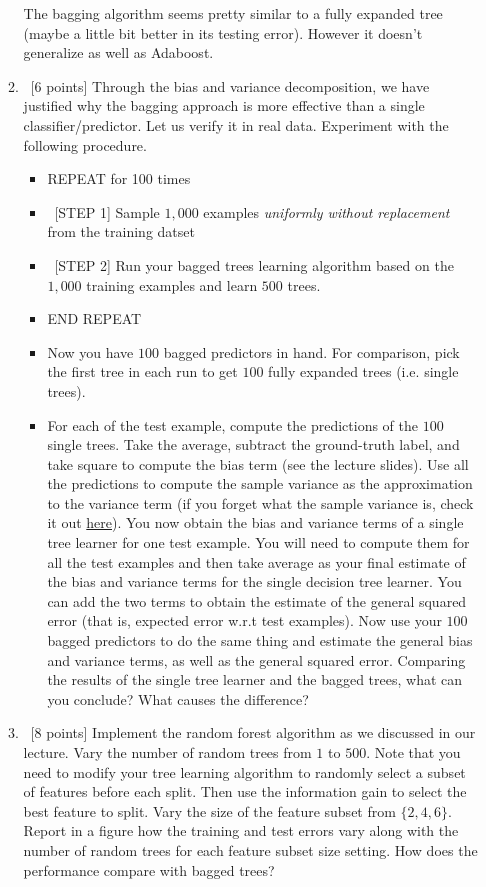 \documentclass[12pt, fullpage,letterpaper]{article}
\begin{document}
\begin{enumerate}
\begin{enumerate}
	\newline
	The bagging algorithm seems pretty similar to a fully expanded tree (maybe a little bit better in its testing error).  However it doesn't generalize as well as Adaboost.
	\item~[6 points] Through the bias and variance decomposition, we have justified why the bagging approach is more effective than a single classifier/predictor. Let us verify it in real data. Experiment with the following procedure.
	\begin{itemize}
		\item REPEAT for 100 times
		\item ~[STEP 1] Sample $1,000$ examples \textit{uniformly without replacement} from the training datset
		\item ~[STEP 2] Run your bagged trees learning algorithm based on the $1,000$ training examples and learn $500$ trees.
		\item END REPEAT 
		\item Now you have $100$ bagged predictors in hand. For comparison, pick the first tree in each run to get $100$ fully expanded trees (i.e. single trees). 
		\item 	For each of the test example, compute the predictions of the $100$ single trees. Take the average, subtract the ground-truth label, and take square to compute the bias term (see the lecture slides). Use all the predictions to compute the sample variance  as the approximation to the variance term (if you forget what the sample variance is, check it out 
		\href{http://www.randomservices.org/random/sample/Variance.html}{here}). You now obtain the bias and variance terms of a single tree learner for one test example. You will need to compute them for all the test examples and then take average as your final estimate of the bias and variance terms for the single decision tree learner. You can add the two terms to obtain the estimate of the general squared error (that is, expected error w.r.t test examples). Now use your $100$ bagged predictors to do the same thing and estimate the general bias and variance terms, as well as the general squared error.  Comparing the results of the single tree learner and the bagged trees, what can you conclude?  What causes the difference?  
	\end{itemize}
	 
	\item~[8 points] Implement the random forest algorithm as we discussed in our lecture. Vary the number of random trees from $1$ to $500$. Note that you need to modify your tree learning algorithm to randomly select a subset of features before each split. Then use the information gain to select the best feature to split.  Vary the size of the feature subset from $\{2, 4, 6\}$.  Report in a figure how the training and test errors vary along with the number of random trees for each feature subset size setting. How does the performance compare with bagged trees? 
	

\end{enumerate}
\end{enumerate}
\end{document}
